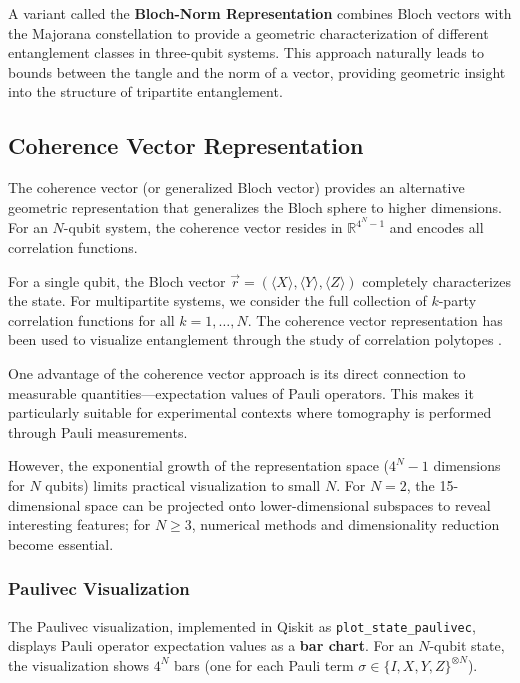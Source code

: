 \documentclass[%
 amsmath,amssymb,
 aps,
rmp,
]{revtex4-2}
\begin{document}
A variant called the \textbf{Bloch-Norm Representation} combines Bloch vectors with the Majorana constellation to provide a geometric characterization of different entanglement classes in three-qubit systems. This approach naturally leads to bounds between the tangle and the norm of a vector, providing geometric insight into the structure of tripartite entanglement.

\subsection{Coherence Vector Representation}
\label{sec:coherence}

The coherence vector (or generalized Bloch vector) provides an alternative geometric representation that generalizes the Bloch sphere to higher dimensions. For an $N$-qubit system, the coherence vector resides in $\mathbb{R}^{4^N - 1}$ and encodes all correlation functions.

For a single qubit, the Bloch vector $\vec{r} = (\langle X \rangle, \langle Y \rangle, \langle Z \rangle)$ completely characterizes the state. For multipartite systems, we consider the full collection of $k$-party correlation functions for all $k = 1, \ldots, N$. The coherence vector representation has been used to visualize entanglement through the study of correlation polytopes \cite{EntangledGraphs}.

One advantage of the coherence vector approach is its direct connection to measurable quantities---expectation values of Pauli operators. This makes it particularly suitable for experimental contexts where tomography is performed through Pauli measurements.

However, the exponential growth of the representation space ($4^N - 1$ dimensions for $N$ qubits) limits practical visualization to small $N$. For $N = 2$, the 15-dimensional space can be projected onto lower-dimensional subspaces to reveal interesting features; for $N \geq 3$, numerical methods and dimensionality reduction become essential.

\subsubsection{Paulivec Visualization}
\label{sec:paulivec}

The Paulivec visualization, implemented in Qiskit as \texttt{plot\_state\_paulivec}, displays Pauli operator expectation values as a \textbf{bar chart}. For an $N$-qubit state, the visualization shows $4^N$ bars (one for each Pauli term $\sigma \in \{I,X,Y,Z\}^{\otimes N}$).
\end{document}
